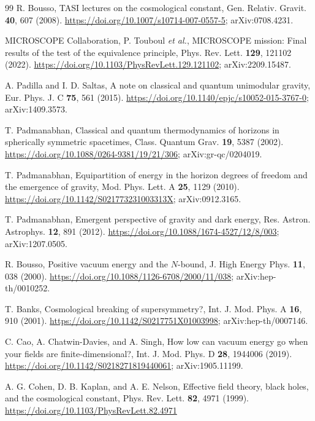 \documentclass[aps,prd,twocolumn,superscriptaddress,nofootinbib,showkeys]{revtex4-2}
\begin{document}
\begin{thebibliography}{99}
 R. Bousso, TASI lectures on the cosmological constant, Gen. Relativ. Gravit. \textbf{40}, 607 (2008). \url{https://doi.org/10.1007/s10714-007-0557-5}; arXiv:0708.4231.

 MICROSCOPE Collaboration, P. Touboul \emph{et al.}, MICROSCOPE mission: Final results of the test of the equivalence principle, Phys. Rev. Lett. \textbf{129}, 121102 (2022). \url{https://doi.org/10.1103/PhysRevLett.129.121102}; arXiv:2209.15487.

 A. Padilla and I. D. Saltas, A note on classical and quantum unimodular gravity, Eur. Phys. J. C \textbf{75}, 561 (2015). \url{https://doi.org/10.1140/epjc/s10052-015-3767-0}; arXiv:1409.3573.

 T. Padmanabhan, Classical and quantum thermodynamics of horizons in spherically symmetric spacetimes, Class. Quantum Grav. \textbf{19}, 5387 (2002). \url{https://doi.org/10.1088/0264-9381/19/21/306}; arXiv:gr-qc/0204019.

 T. Padmanabhan, Equipartition of energy in the horizon degrees of freedom and the emergence of gravity, Mod. Phys. Lett. A \textbf{25}, 1129 (2010). \url{https://doi.org/10.1142/S021773231003313X}; arXiv:0912.3165.

 T. Padmanabhan, Emergent perspective of gravity and dark energy, Res. Astron. Astrophys. \textbf{12}, 891 (2012). \url{https://doi.org/10.1088/1674-4527/12/8/003}; arXiv:1207.0505.

 R. Bousso, Positive vacuum energy and the $N$-bound, J. High Energy Phys. \textbf{11}, 038 (2000). \url{https://doi.org/10.1088/1126-6708/2000/11/038}; arXiv:hep-th/0010252.

 T. Banks, Cosmological breaking of supersymmetry?, Int. J. Mod. Phys. A \textbf{16}, 910 (2001). \url{https://doi.org/10.1142/S0217751X01003998}; arXiv:hep-th/0007146.

 C. Cao, A. Chatwin-Davies, and A. Singh, How low can vacuum energy go when your fields are finite-dimensional?, Int. J. Mod. Phys. D \textbf{28}, 1944006 (2019). \url{https://doi.org/10.1142/S0218271819440061}; arXiv:1905.11199.

 A. G. Cohen, D. B. Kaplan, and A. E. Nelson, Effective field theory, black holes, and the cosmological constant, Phys. Rev. Lett. \textbf{82}, 4971 (1999). \url{https://doi.org/10.1103/PhysRevLett.82.4971}


\end{thebibliography}
\end{document}
